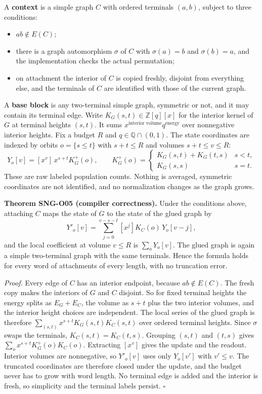 \documentclass[
  11pt,
  a4paper,
]{report}
\providecommand{\tightlist}{%
  \setlength{\itemsep}{0pt}\setlength{\parskip}{0pt}}
\begin{document}
A \textbf{context} is a simple graph \(C\) with ordered terminals
\((a,b)\), subject to three conditions:

\begin{itemize}
\tightlist
\item
  \(ab\notin E(C)\);
\item
  there is a graph automorphism \(\sigma\) of \(C\) with \(\sigma(a)=b\)
  and \(\sigma(b)=a\), and the implementation checks the actual
  permutation;
\item
  on attachment the interior of \(C\) is copied freshly, disjoint from
  everything else, and the terminals of \(C\) are identified with those
  of the current graph.
\end{itemize}

A \textbf{base block} is any two-terminal simple graph, symmetric or
not, and it may contain its terminal edge. Write
\(K_G(s,t)\in\mathbb Z[q][x]\) for the interior kernel of \(G\) at
terminal heights \((s,t)\). It sums
\(x^{\text{interior volume}}q^{\text{energy}}\) over nonnegative
interior heights. Fix a budget \(R\) and \(q\in\mathbb Q\cap(0,1)\). The
state coordinates are indexed by orbits \(o=\{s\le t\}\) with
\(s+t\le R\) and volumes \(s+t\le v\le R\): \[
Y_{o}[v]=[x^v]\,x^{s+t}K_G^+(o),\qquad
K_G^+(o)=\begin{cases}K_G(s,t)+K_G(t,s)&s<t,\\ K_G(s,s)&s=t.\end{cases}
\] These are raw labeled population counts. Nothing is averaged,
symmetric coordinates are not identified, and no normalization changes
as the graph grows.

\textbf{Theorem SNG-O05 (compiler correctness).} Under the conditions
above, attaching \(C\) maps the state of \(G\) to the state of the glued
graph by \[
Y'_o[v]=\sum_{j=0}^{v-s-t}[x^j]K_C(o)\,Y_o[v-j],
\] and the local coefficient at volume \(v\le R\) is \(\sum_oY_o[v]\).
The glued graph is again a simple two-terminal graph with the same
terminals. Hence the formula holds for every word of attachments of
every length, with no truncation error.

\emph{Proof.} Every edge of \(C\) has an interior endpoint, because
\(ab\notin E(C)\). The fresh copy makes the interiors of \(G\) and \(C\)
disjoint. So for fixed terminal heights the energy splits as
\(E_G+E_C\), the volume as \(s+t\) plus the two interior volumes, and
the interior height choices are independent. The local series of the
glued graph is therefore \(\sum_{(s,t)}x^{s+t}K_G(s,t)K_C(s,t)\) over
ordered terminal heights. Since \(\sigma\) swaps the terminals,
\(K_C(s,t)=K_C(t,s)\). Grouping \((s,t)\) and \((t,s)\) gives
\(\sum_ox^{s+t}K_G^+(o)K_C(o)\). Extracting \([x^v]\) gives the update
and the readout. Interior volumes are nonnegative, so \(Y'_o[v]\) uses
only \(Y_o[v']\) with \(v'\le v\). The truncated coordinates are
therefore closed under the update, and the budget never has to grow with
word length. No terminal edge is added and the interior is fresh, so
simplicity and the terminal labels persist. \(\square\)
\end{document}
